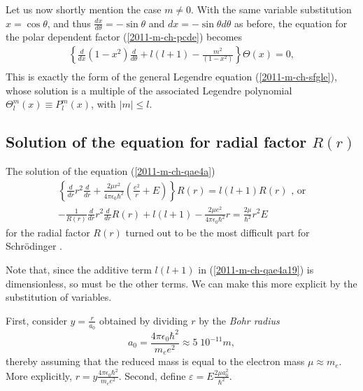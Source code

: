 Let us now shortly mention the case $m\neq 0$.
With the same variable substitution  $x = \cos \theta$, and thus
$\frac{dx}{d\theta}= -\sin \theta$ and  $dx= -\sin \theta d\theta$ as before,
the equation for the polar dependent factor (\ref{2011-m-ch-pcde})
becomes
\begin{equation}
\begin{array}{l}
\left\{
\frac{   d   }{   d    x }
(1-x^2) \frac{   d    }{   d    \theta }  +  l(l+1)   -\frac{m^2}{(1-x^2)}
\right\}
\Theta(x)  =0,\\
\end{array}
\label{2011-m-ch-pcde9}
\end{equation}
This is exactly the form of the
general Legendre equation (\ref{2011-m-ch-sfgle}), whose solution is a multiple
of the associated Legendre polynomial   $\Theta_l^m(x) \equiv P_l^m(x)$, with $\vert m\vert \le l$.


\subsection{Solution of the equation  for radial factor $R(r)$}


The solution of the equation   (\ref{2011-m-ch-qae4a})
\begin{equation}
\begin{array}{l}
\left\{  \frac{   d   }{   d    r}  r^2\frac{   d   }{   d    r}   +
\frac{2\mu r^2}{4\pi \epsilon_0\hbar^2} \left(\frac{e^2}{r} + E \right) \right\} R(r)
 =  l(l+1)  R( r ) \textrm{ , or}\\
-\frac{1}{R(r)} \frac{d}{   d    r}  r^2\frac{   d   }{   d    r} R( r ) +    l(l+1)
-\frac{2\mu e^2}{4\pi \epsilon_0\hbar^2} r
 = \frac{2\mu  }{ \hbar^2}  r^2 E
\end{array}
\label{2011-m-ch-qae4a19}
\end{equation}
for the radial factor $R(r)$
turned out to be the most difficult part for Schr\"odinger
\cite{Moore-Schroedinger}.

Note that, since the additive term  $ l(l+1) $ in (\ref{2011-m-ch-qae4a19}) is dimensionless,
so must be the other terms.
We can make this more explicit by the substitution of variables.

First, consider $y =\frac{r}{a_0}$ obtained by dividing $r$ by the
{\em Bohr radius}
\begin{equation}
a_0= \frac{4\pi \epsilon_0 \hbar^2}{m_e e^2}\approx 5\; 10^{-11} m,
\label{2011-m-ch-qaebohrr}
\end{equation}
thereby assuming that the reduced mass is equal to the electron mass $\mu \approx m_e$.
More explicitly,
$r=y  \frac{4\pi \epsilon_0 \hbar^2}{m_e e^2}$.
Second, define $\varepsilon = E \frac{2\mu a_0^2}{\hbar^2}$.

